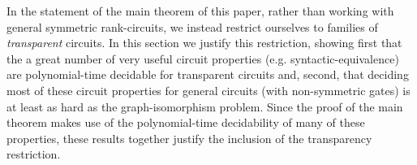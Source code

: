 \documentclass[../paper.tex]{subfiles}
\begin{document}

In the statement of the main theorem of this paper, rather than working with
general symmetric rank-circuits, we instead restrict ourselves to families of
\emph{transparent} circuits. In this section we justify this restriction,
showing first that the a great number of very useful circuit properties (e.g.
syntactic-equivalence) are polynomial-time decidable for transparent circuits
and, second, that deciding most of these circuit properties for general circuits
(with non-symmetric gates) is at least as hard as the graph-isomorphism
problem. Since the proof of the main theorem makes use of the polynomial-time
decidability of many of these properties, these results together justify the
inclusion of the transparency restriction.


\end{document}
